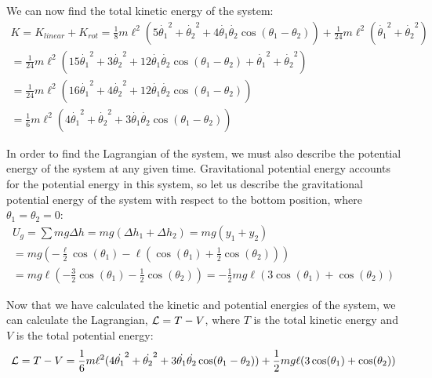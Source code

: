 \documentclass[]{article}
\begin{document}
We can now find the total kinetic energy of the system:
\begin{gather*}
	K = K_{linear} + K_{rot} = \frac{1}{8}m\ell^2(5\dot{\theta_1}^2 + \dot{\theta_2}^2 + 4\dot{\theta_1}\dot{\theta_2}\cos(\theta_1 - \theta_2)) + \frac{1}{24}m\ell^2(\dot{\theta_1}^2 + \dot{\theta_2}^2) \\
	= \frac{1}{24}m\ell^2(15\dot{\theta_1}^2 + 3\dot{\theta_2}^2 + 12\dot{\theta_1}\dot{\theta_2}\cos(\theta_1 - \theta_2) + \dot{\theta_1}^2 + \dot{\theta_2}^2) \\
	= \frac{1}{24}m\ell^2(16\dot{\theta_1}^2 + 4\dot{\theta_2}^2 + 12\dot{\theta_1}\dot{\theta_2}\cos(\theta_1 - \theta_2) ) \\
	= \frac16m\ell^2(4\dot{\theta_1}^2 + \dot{\theta_2}^2 + 3\dot{\theta_1}\dot{\theta_2}\cos(\theta_1 - \theta_2))
\end{gather*}

In order to find the Lagrangian of the system, we must also describe the potential energy of the system at any given time. Gravitational potential energy accounts for the potential energy in this system, so let us describe the gravitational potential energy of the system with respect to the bottom position, where $\theta_1 = \theta_2 = 0$:
\begin{gather*}
	U_g = \sum mg\Delta h = mg(\Delta h_1 + \Delta h_2) = mg(y_1 + y_2) \\
	= mg(-\frac{\ell}{2}\cos(\theta_1)- \ell (\cos(\theta_1) + \frac{1}{2} \cos(\theta_2))) \\
	= mg\ell(-\frac32\cos(\theta_1) - \frac12\cos(\theta_2)) = -\frac12 mg\ell(3\cos(\theta_1) + \cos(\theta_2))
\end{gather*}

Now that we have calculated the kinetic and potential energies of the system, we can calculate the Lagrangian, $\mathcal{L} = T - V$, where $T$ is the total kinetic energy and $V$ is the total potential energy:
\begin{gather*}
	\mathcal{L} = T - V = \frac16m\ell^2(4\dot{\theta_1}^2 + \dot{\theta_2}^2 + 3\dot{\theta_1}\dot{\theta_2}\cos(\theta_1 - \theta_2)) + \frac12 mg\ell(3\cos(\theta_1) + \cos(\theta_2))
\end{gather*}
\end{document}
